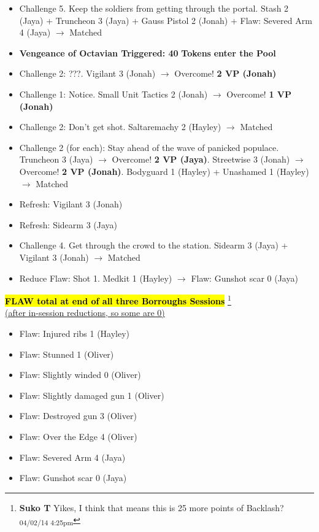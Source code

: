 \begin{itemize}[noitemsep,topsep=0pt]
\item Challenge 5.  Keep the soldiers from getting through the portal.  Stash 2 (Jaya) + Truncheon 3 (Jaya) + Gauss Pistol 2 (Jonah) +  {\color[RGB]{255,0,0}Flaw: Severed Arm 4 (Jaya)}  $\rightarrow$ Matched
\item \textbf{Vengeance of Octavian Triggered: 40}\textbf{ Tokens}\textbf{ enter the Pool}
\item Challenge 2: ???.  Vigilant 3 (Jonah)  $\rightarrow$ Overcome! \textbf{2 VP (Jonah)}
\item Challenge 1: Notice.  Small Unit Tactics 2 (Jonah)  $\rightarrow$ Overcome! \textbf{1 VP (Jonah)}
\item Challenge 2: Don't get shot.  Saltaremachy 2 (Hayley) $\rightarrow$ Matched
\item Challenge 2 (for each): Stay ahead of the wave of panicked populace.   Truncheon 3 (Jaya)  $\rightarrow$ Overcome! \textbf{2 VP (Jaya)}.  Streetwise 3  (Jonah) $\rightarrow$ Overcome! \textbf{2 VP (Jonah)}. Bodyguard 1 (Hayley) + Unashamed 1 (Hayley)  $\rightarrow$ Matched
\item Refresh: Vigilant 3 (Jonah)
\item Refresh: Sidearm 3 (Jaya)
\item Challenge 4.  Get through the crowd to the station.  Sidearm 3 (Jaya) + Vigilant 3 (Jonah)  $\rightarrow$ Matched
\item Reduce Flaw: Shot 1.  Medkit 1 (Hayley) $\rightarrow$   {\color[RGB]{255,0,0}Flaw: Gunshot scar 0 (Jaya)} 
\end{itemize}




\textbf{\hl{FLAW total at end of all three Borroughs Sessions} }\footnote{\textbf{Suko T }Yikes, I think that means this is 25 more points of Backlash? \textsubscript{04/02/14 4:25pm}}\\
\underline{   (after in-session reductions, so some are 0) }

\begin{itemize}[noitemsep,topsep=0pt]
\item  {\color[RGB]{255,0,0}Flaw: Injured ribs 1 (Hayley)} 
\item  {\color[RGB]{255,0,0}Flaw: Stunned 1 (Oliver)} 
\item  {\color[RGB]{255,0,0}Flaw: Slightly winded 0 (Oliver)} 
\item  {\color[RGB]{255,0,0}Flaw: Slightly damaged gun 1 (Oliver)} 
\item  {\color[RGB]{255,0,0}Flaw: Destroyed gun 3 (Oliver)} 
\item  {\color[RGB]{255,0,0}Flaw: Over the Edge 4 (Oliver)} 
\item  {\color[RGB]{255,0,0}Flaw: Severed Arm 4 (Jaya)} 
\item  {\color[RGB]{255,0,0}Flaw: Gunshot scar 0 (Jaya)} 
\end{itemize}





